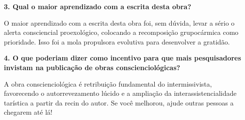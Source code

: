 \documentclass{gescons}
\begin{document}
\begin{multicols}{2}
\textbf{3. Qual o maior aprendizado com a escrita desta obra?}

O maior aprendizado com a escrita desta obra foi, sem dúvida, levar a sério o alerta consciencial proexológico, colocando a recomposição grupocármica como prioridade. Isso foi a mola propulsora evolutiva para desenvolver a gratidão. 

\textbf{4. O que poderiam dizer como incentivo para que mais pesquisadores invistam na publicação de obras conscienciológicas?}

A obra conscienciológica é retribuição fundamental do intermissivista, favorecendo o autorrevezamento lúcido e a ampliação da interassistencialidade tarística a partir da recin do autor. Se você melhorou, ajude outras pessoas a chegarem até lá! 
    
    
    \end{multicols}
\end{document}
